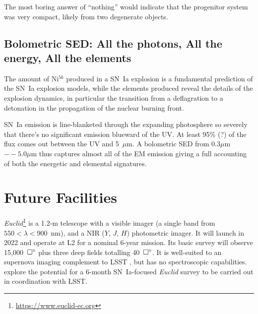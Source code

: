 \documentclass[12pt,preprint]{aastex}
\newcommand{\snia}{SN~Ia\xspace}
\newcommand{\tbd}{{\color{red}}}
\begin{document}
The most boring answer of ``nothing'' would indicate that the progenitor system was very compact, likely from two degenerate objects.  

\iffalse
\subsection{Current Limits from K2, ASASSN Supernovae}

{\tbd Quote and describe the current work with early-time lightcurves from K2, ASASSN}

{\tbd If something comes out of ZTF, add that here.}
\fi

\subsection{Bolometric SED: All the photons, All the energy, All the elements}
The amount of Ni$^{56}$ produced in a SN~Ia explosion is a fundamental prediction of the SN~Ia explosion models, while the elements produced reveal the details of the explosion dynamics, in particular the transition from a deflagration to a detonation in the propagation of the nuclear burning front.

SN~Ia emission is line-blanketed through the expanding photosphere so severely that there's no significant emission blueward of the UV.  At least 95\% (?) of the flux comes out between the UV and 5~$\mu$m.  A bolometric SED from $0.3\mu$m$--5.0\mu$m thus captures almost all of the EM emission giving a full accounting of both the energetic and elemental signatures.




\section{Future Facilities}

{\it Euclid}\footnote{\url{https://www.euclid-ec.org}} is a 1.2-m telescope with a visible imager (a single band from $550<\lambda<900$~nm), and a NIR ($Y$, $J$, $H$) photometric imager.  It will launch in 2022 and operate at L2 for a nominal 6-year mission.  Its basic survey will observe 15,000~$\square\mbox{$^\circ$}$ plus three deep fields totalling 40~$\square\mbox{$^\circ$}$.  It is well-suited to an supernova imaging complement to LSST \citep{Astier14}, but has no spectroscopic capabilities.  \citet{Astier14} explore the potential for a 6-month \snia-focused {\it Euclid} survey to be carried out in coordination with LSST.
\end{document}
